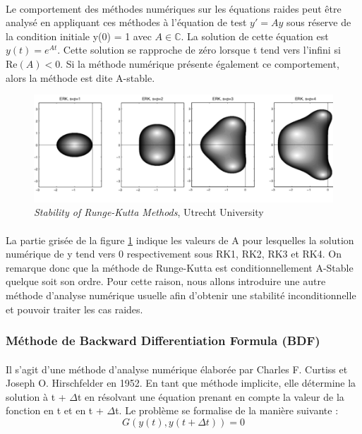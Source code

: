         \paragraph{}
        Le comportement des méthodes numériques sur les équations raides peut être analysé en appliquant ces méthodes à l'équation de test $y' = Ay$ sous réserve de la condition initiale y(0) = 1 avec $A \in \mathbb{C}$. La solution de cette équation est $y (t) = e^{At}$. Cette solution se rapproche de zéro lorsque t tend vers l'infini si $\mathrm{Re}(A)<0$. Si la méthode numérique présente également ce comportement, alors la méthode est dite A-stable.
        \begin{figure}
            \centering
            \includegraphics[width=\textwidth]{images/astab_rk.png}
            \caption{\textit{Stability of Runge-Kutta Methods}, Utrecht University}
            \label{fig:astab_rk}
        \end{figure}

        \paragraph{}
        La partie grisée de la figure \ref{fig:astab_rk} indique les valeurs de A pour lesquelles la solution numérique de y tend vers 0 respectivement sous RK1, RK2, RK3 et RK4. On remarque donc que la méthode de Runge-Kutta est conditionnellement A-Stable quelque soit son ordre. Pour cette raison, nous allons introduire une autre méthode d'analyse numérique usuelle afin d'obtenir une stabilité inconditionnelle et pouvoir traiter les cas raides.

    \subsubsection{Méthode de Backward Differentiation Formula (BDF)}
        \paragraph{}
        Il s'agit d'une méthode d'analyse numérique élaborée par Charles F. Curtiss et Joseph O. Hirschfelder en 1952. En tant que méthode implicite, elle détermine la solution à t +  $\Delta$t en résolvant une équation prenant en compte la valeur de la fonction en t et en t +  $\Delta$t. Le problème se formalise de la manière suivante :
        \begin{equation}
            G(y(t), y(t+\Delta t)) = 0
        \end{equation}

